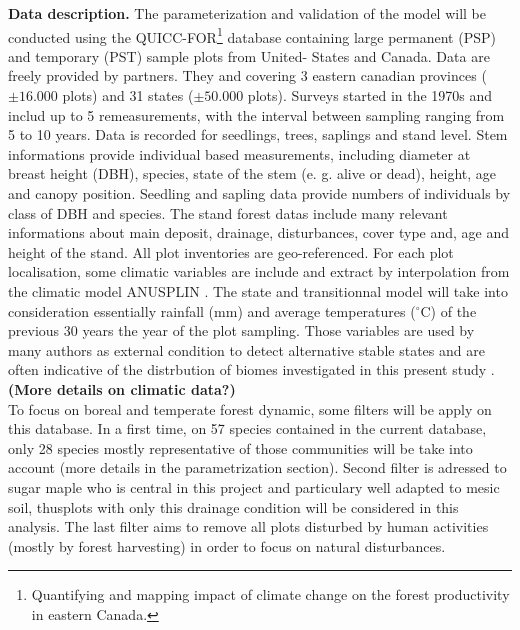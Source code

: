 \textbf{Data description.}  The parameterization and validation of the model
will be conducted using the QUICC-FOR\footnote{Quantifying and mapping impact
of climate change on the forest productivity in eastern Canada.} database
containing large permanent (PSP) and temporary (PST) sample plots  from
United- States and Canada. Data are freely provided by partners. They and
covering 3 eastern canadian provinces ($\pm16.000$ plots) and 31 states
($\pm50.000$ plots). Surveys started in the 1970s and includ up to 5
remeasurements, with the interval between sampling ranging from 5 to 10 years.
Data is recorded for seedlings, trees, saplings and stand level. Stem
informations provide individual based measurements, including diameter at
breast height (DBH), species, state of the stem (e. g. alive or dead), height,
age and canopy position. Seedling and sapling data provide numbers of
individuals by class of DBH and species. The stand forest datas include many
relevant informations about main deposit, drainage, disturbances, cover type
and, age and height of the stand. All plot inventories are geo-referenced. For
each plot localisation, some climatic variables are include and extract by
interpolation from the climatic model ANUSPLIN \cite{McKenney2011}. The state
and transitionnal model will take into consideration essentially rainfall (mm)
and average temperatures (\ensuremath{^\circ}C) of the previous 30 years the
year of the plot sampling. Those variables are used by many authors as
external condition to detect alternative stable states and are often
indicative of the distrbution of biomes investigated in this present study
\cite{Goldblum2010,Hirota2011,Scheffer2012}. \textbf{(More details on climatic
data?)}\\

To focus on boreal and temperate forest dynamic, some filters will be apply on
this database.  In a first time, on 57 species contained in the current
database, only 28 species mostly representative of those communities will be
take into account (more details in the parametrization section).
Second filter is adressed to sugar maple who is central in this project and
particulary well adapted to mesic soil, thusplots with  only this drainage
condition will be considered in this analysis. The last filter aims to remove
all plots disturbed by human activities (mostly by forest harvesting) in order
to focus on natural disturbances. \\

